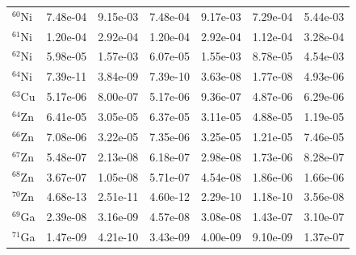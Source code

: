 \begin{table}
\begin{tabular}{l|cc|cc|cc}
$^{60}$Ni & 7.48e-04 & 9.15e-03 & 7.48e-04 & 9.17e-03 & 7.29e-04 & 5.44e-03\\
$^{61}$Ni & 1.20e-04 & 2.92e-04 & 1.20e-04 & 2.92e-04 & 1.12e-04 & 3.28e-04\\
$^{62}$Ni & 5.98e-05 & 1.57e-03 & 6.07e-05 & 1.55e-03 & 8.78e-05 & 4.54e-03\\
$^{64}$Ni & 7.39e-11 & 3.84e-09 & 7.39e-10 & 3.63e-08 & 1.77e-08 & 4.93e-06\\
$^{63}$Cu & 5.17e-06 & 8.00e-07 & 5.17e-06 & 9.36e-07 & 4.87e-06 & 6.29e-06\\
$^{64}$Zn & 6.41e-05 & 3.05e-05 & 6.37e-05 & 3.11e-05 & 4.88e-05 & 1.19e-05\\
$^{66}$Zn & 7.08e-06 & 3.22e-05 & 7.35e-06 & 3.25e-05 & 1.21e-05 & 7.46e-05\\
$^{67}$Zn & 5.48e-07 & 2.13e-08 & 6.18e-07 & 2.98e-08 & 1.73e-06 & 8.28e-07\\
$^{68}$Zn & 3.67e-07 & 1.05e-08 & 5.71e-07 & 4.54e-08 & 1.86e-06 & 1.66e-06\\
$^{70}$Zn & 4.68e-13 & 2.51e-11 & 4.60e-12 & 2.29e-10 & 1.18e-10 & 3.56e-08\\
$^{69}$Ga & 2.39e-08 & 3.16e-09 & 4.57e-08 & 3.08e-08 & 1.43e-07 & 3.10e-07\\
$^{71}$Ga & 1.47e-09 & 4.21e-10 & 3.43e-09 & 4.00e-09 & 9.10e-09 & 1.37e-07\\
\hline
\end{tabular}
\end{table}
\newpage


